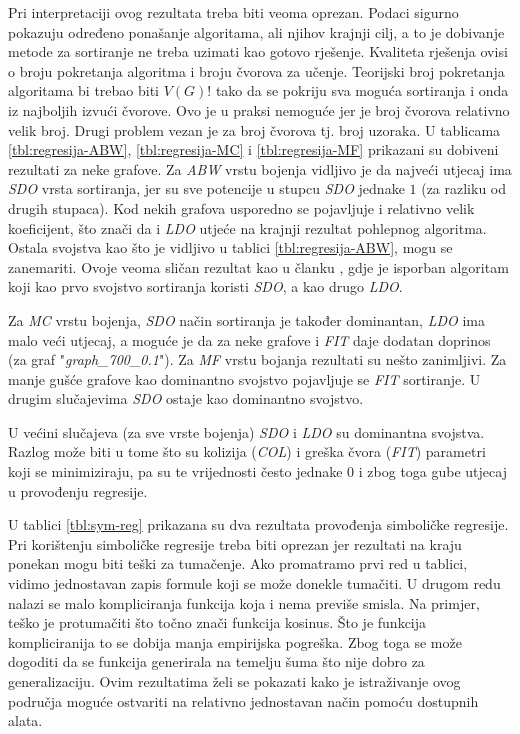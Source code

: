 \documentclass[times, utf8, diplomski, numeric]{fer}
\begin{document}
Pri interpretaciji ovog rezultata treba biti veoma oprezan. Podaci sigurno pokazuju određeno ponašanje algoritama, ali njihov krajnji cilj, a to je dobivanje metode za sortiranje ne treba uzimati kao gotovo rješenje. Kvaliteta rješenja ovisi o broju pokretanja algoritma i broju čvorova za učenje. Teorijski broj pokretanja algoritama bi trebao biti $V(G)!$ tako da se pokriju sva moguća sortiranja i onda iz najboljih izvući čvorove. Ovo je u praksi nemoguće jer je broj čvorova relativno velik broj. Drugi problem vezan je za broj čvorova tj. broj uzoraka. U tablicama \ref{tbl:regresija-ABW}, \ref{tbl:regresija-MC} i \ref{tbl:regresija-MF} prikazani su dobiveni rezultati za neke grafove. Za \emph{ABW} vrstu bojenja vidljivo je da najveći utjecaj ima \emph{SDO} vrsta sortiranja, jer su sve potencije u stupcu \emph{SDO} jednake $1$ (za razliku od drugih stupaca). Kod nekih grafova usporedno se pojavljuje i relativno velik koeficijent, što znači da i \emph{LDO} utjeće na krajnji rezultat pohlepnog algoritma. Ostala svojstva kao što je vidljivo u tablici \ref{tbl:regresija-ABW}, mogu se zanemariti. Ovoje veoma sličan rezultat kao u članku \cite{lit7}, gdje je isporban algoritam koji kao prvo svojstvo sortiranja koristi \emph{SDO}, a kao drugo \emph{LDO}.

Za \emph{MC} vrstu bojenja, \emph{SDO} način sortiranja je također dominantan, \emph{LDO} ima malo veći utjecaj, a moguće je da za neke grafove i \emph{FIT} daje dodatan doprinos (za graf "\emph{graph\_700\_0.1}"). Za \emph{MF} vrstu bojanja rezultati su nešto zanimljivi. Za manje gušće grafove kao dominantno svojstvo pojavljuje se \emph{FIT} sortiranje. U drugim slučajevima \emph{SDO} ostaje kao dominantno svojstvo.

U većini slučajeva (za sve vrste bojenja) \emph{SDO} i \emph{LDO} su dominantna svojstva. Razlog može biti u tome što su kolizija (\emph{COL}) i greška čvora (\emph{FIT}) parametri koji se minimiziraju, pa su te vrijednosti često jednake $0$ i zbog toga gube utjecaj u provođenju regresije. 

U tablici \ref{tbl:sym-reg} prikazana su dva rezultata provođenja simboličke regresije. Pri korištenju simboličke regresije treba biti oprezan jer rezultati na kraju ponekan mogu biti teški za tumačenje. Ako promatramo prvi red u tablici, vidimo jednostavan zapis formule koji se može donekle tumačiti. U drugom redu nalazi se malo kompliciranja funkcija koja i nema previše smisla. Na primjer, teško je protumačiti što točno znači funkcija kosinus. Što je funkcija kompliciranija to se dobija manja empirijska pogreška. Zbog toga se može dogoditi da se funkcija generirala na temelju šuma što nije dobro za generalizaciju. Ovim rezultatima želi se pokazati kako je istraživanje ovog područja moguće ostvariti na relativno jednostavan način pomoću dostupnih alata.
\end{document}
